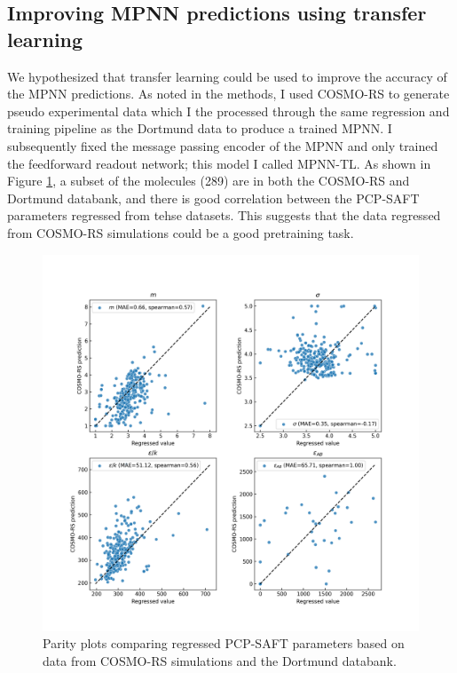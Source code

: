 \subsection{Improving MPNN predictions using transfer learning}

We hypothesized that transfer learning could be used to improve the accuracy of the MPNN predictions. As noted in the methods, I used COSMO-RS\cite{Klamt1995, Klamt2010} to generate pseudo experimental data which I the processed through the same regression and training pipeline as the Dortmund data to produce a trained MPNN. I subsequently fixed the message passing encoder of the MPNN and only trained the feedforward readout network; this model I called MPNN-TL. As shown in Figure \ref{fig:cosmo_dortmund}, a subset of the molecules (289) are in both the COSMO-RS and Dortmund databank, and there is good correlation between the PCP-SAFT parameters regressed from tehse datasets. This suggests that the data regressed from  COSMO-RS simulations could be a good pretraining task. 

\begin{figure}
    \centering
    \includegraphics[width=\textwidth]{gfx/Chapter08/cosmo_dortmund_parameter_correlations.png}
    \caption{Parity plots comparing regressed PCP-SAFT parameters based on data from COSMO-RS simulations and the Dortmund databank.}
    \label{fig:cosmo_dortmund}
\end{figure}

